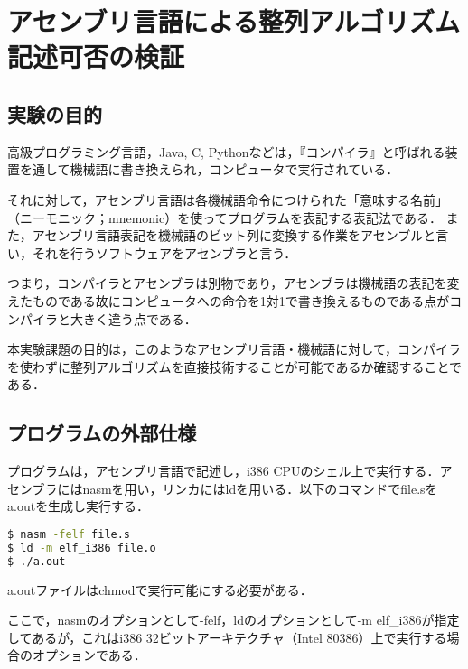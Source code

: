 \section{アセンブリ言語による整列アルゴリズム記述可否の検証}
\subsection{実験の目的}
高級プログラミング言語，{\ttfamily Java, C, Python}などは，『コンパイラ』と呼ばれる装置を通して機械語に書き換えられ，コンピュータで実行されている．\par
それに対して，アセンブリ言語は各機械語命令につけられた「意味する名前」（ニーモニック；mnemonic）を使ってプログラムを表記する表記法である．
また，アセンブリ言語表記を機械語のビット列に変換する作業をアセンブルと言い，それを行うソフトウェアをアセンブラと言う．\cite{assembly}\par
つまり，コンパイラとアセンブラは別物であり，アセンブラは機械語の表記を変えたものである故にコンピュータへの命令を1対1で書き換えるものである点がコンパイラと大きく違う点である．\par
本実験課題の目的は，このようなアセンブリ言語・機械語に対して，コンパイラを使わずに整列アルゴリズムを直接技術することが可能であるか確認することである．
\subsection{プログラムの外部仕様}
プログラムは，アセンブリ言語で記述し，i386 CPUのシェル上で実行する．アセンブラには{\ttfamily nasm}を用い，リンカには{\ttfamily ld}を用いる．以下のコマンドで{\ttfamily file.s}を{\ttfamily a.out}を生成し実行する．
\begin{lstlisting}[language={Bash},numbers = {none},frame = {single}]
$ nasm -felf file.s
$ ld -m elf_i386 file.o
$ ./a.out
    \end{lstlisting}
{\ttfamily a.out}ファイルは{\ttfamily chmod}で実行可能にする必要がある．\par
ここで，{\ttfamily nasm}のオプションとして{\ttfamily -felf}，{\ttfamily ld}のオプションとして{\ttfamily -m elf\_i386}が指定してあるが，これはi386 32ビットアーキテクチャ（Intel 80386）上で実行する場合のオプションである．

